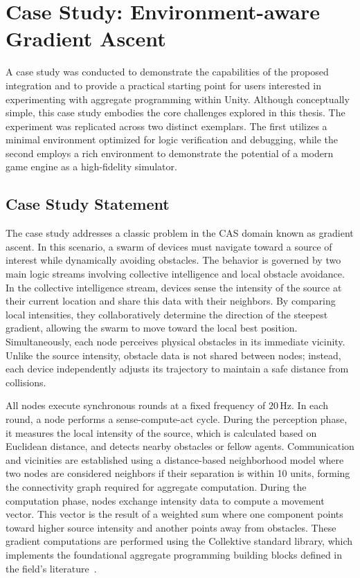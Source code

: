 \chapter{Case Study: Environment-aware Gradient Ascent} \label{chap:casestudy}

A case study was conducted to demonstrate the capabilities of the proposed integration and to provide a practical starting point for users interested in experimenting with aggregate programming within Unity. Although conceptually simple, this case study embodies the core challenges explored in this thesis. The experiment was replicated across two distinct exemplars. The first utilizes a minimal environment optimized for logic verification and debugging, while the second employs a rich environment to demonstrate the potential of a modern game engine as a high-fidelity simulator.

\section{Case Study Statement}

The case study addresses a classic problem in the \ac{CAS} domain known as gradient ascent. In this scenario, a swarm of devices must navigate toward a source of interest while dynamically avoiding obstacles. The behavior is governed by two main logic streams involving collective intelligence and local obstacle avoidance. In the collective intelligence stream, devices sense the intensity of the source at their current location and share this data with their neighbors. By comparing local intensities, they collaboratively determine the direction of the steepest gradient, allowing the swarm to move toward the local best position. Simultaneously, each node perceives physical obstacles in its immediate vicinity. Unlike the source intensity, obstacle data is not shared between nodes; instead, each device independently adjusts its trajectory to maintain a safe distance from collisions.

All nodes execute synchronous rounds at a fixed frequency of $20\,\text{Hz}$. In each round, a node performs a sense-compute-act cycle. During the perception phase, it measures the local intensity of the source, which is calculated based on Euclidean distance, and detects nearby obstacles or fellow agents. Communication and vicinities are established using a distance-based neighborhood model where two nodes are considered neighbors if their separation is within 10 units, forming the connectivity graph required for aggregate computation. During the computation phase, nodes exchange intensity data to compute a movement vector. This vector is the result of a weighted sum where one component points toward higher source intensity and another points away from obstacles. These gradient computations are performed using the Collektive standard library, which implements the foundational aggregate programming building blocks defined in the field's literature~\cite{DBLP:journals/tomacs/ViroliABDP18}.

